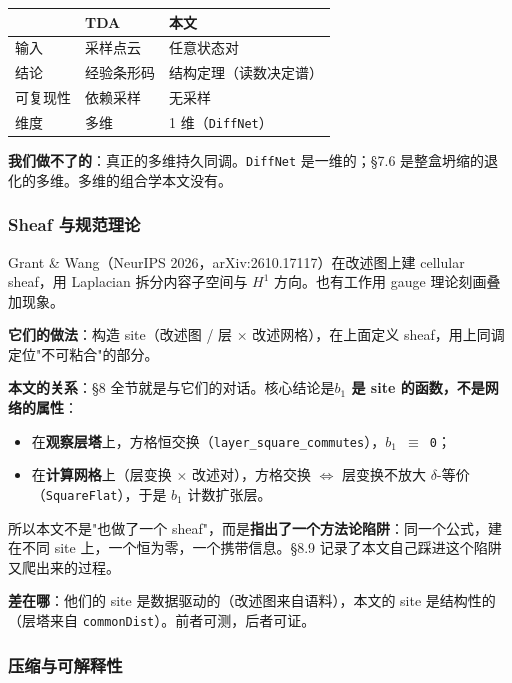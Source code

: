 \documentclass[11pt,a4paper]{ctexart}
\begin{document}
\begin{center}\small
\begin{tabular}{lll}
\toprule
 & TDA & 本文 \\
\midrule
输入 & 采样点云 & 任意状态对 \\
结论 & 经验条形码 & 结构定理（读数决定谱） \\
可复现性 & 依赖采样 & 无采样 \\
维度 & 多维 & 1 维（\texttt{DiffNet}） \\
\bottomrule
\end{tabular}
\end{center}

\textbf{我们做不了的}：真正的多维持久同调。\texttt{DiffNet} 是一维的；§7.6 是整盒坍缩的退化的多维。多维的组合学本文没有。

\subsubsection{Sheaf 与规范理论}

Grant \& Wang（NeurIPS 2026，arXiv:2610.17117）在改述图上建 cellular sheaf，用 Laplacian 拆分内容子空间与 \texttt{\ensuremath{H^{1}}} 方向。也有工作用 gauge 理论刻画叠加现象。

\textbf{它们的做法}：构造 site（改述图 / 层 \ensuremath{\times} 改述网格），在上面定义 sheaf，用上同调定位"不可粘合"的部分。

\textbf{本文的关系}：§8 全节就是与它们的对话。核心结论是\textbf{\texttt{\ensuremath{b_{1}}} 是 site 的函数，不是网络的属性}：

\begin{itemize}
\item 在\textbf{观察层塔}上，方格恒交换（\texttt{layer\_square\_commutes}），\texttt{\ensuremath{b_{1}} \ensuremath{\equiv} 0}；
\item 在\textbf{计算网格}上（层变换 \ensuremath{\times} 改述对），方格交换 \ensuremath{\Longleftrightarrow} 层变换不放大 \texttt{\ensuremath{\delta}}-等价（\texttt{SquareFlat}），于是 \texttt{\ensuremath{b_{1}}} 计数扩张层。
\end{itemize}

所以本文不是"也做了一个 sheaf"，而是\textbf{指出了一个方法论陷阱}：同一个公式，建在不同 site 上，一个恒为零，一个携带信息。§8.9 记录了本文自己踩进这个陷阱又爬出来的过程。

\textbf{差在哪}：他们的 site 是数据驱动的（改述图来自语料），本文的 site 是结构性的（层塔来自 \texttt{commonDist}）。前者可测，后者可证。

\subsubsection{压缩与可解释性}
\end{document}
